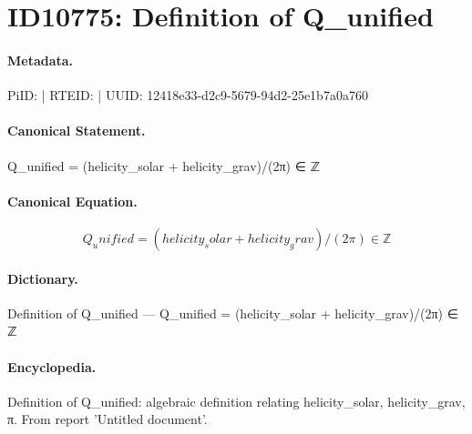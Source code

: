 \section*{ID10775: Definition of Q\_unified}
\paragraph{Metadata.}
PiID:  | RTEID:  | UUID: 12418e33-d2c9-5679-94d2-25e1b7a0a760

\paragraph{Canonical Statement.}
Q\_unified = (helicity\_solar + helicity\_grav)/(2π) ∈ ℤ

\paragraph{Canonical Equation.}
\[
Q_unified = (helicity_solar + helicity_grav)/(2π) ∈ ℤ
\]

\paragraph{Dictionary.}
Definition of Q\_unified — Q\_unified = (helicity\_solar + helicity\_grav)/(2π) ∈ ℤ

\paragraph{Encyclopedia.}
Definition of Q\_unified: algebraic definition relating helicity\_solar, helicity\_grav, π. From report 'Untitled document'.
